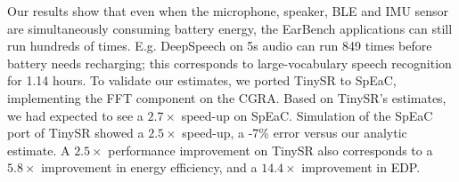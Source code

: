 Our results show that even when the microphone, speaker, BLE and IMU sensor are
simultaneously consuming battery energy, the EarBench applications can still
run hundreds of times. E.g. DeepSpeech on 5s audio can run 849 times before
battery needs recharging; this corresponds to large-vocabulary speech
recognition for 1.14 hours. To validate our estimates, we ported TinySR to
SpEaC, implementing the FFT component on the CGRA. Based on TinySR’s estimates,
we had expected to see a \(2.7\times\) speed-up on SpEaC. Simulation of the SpEaC port
of TinySR showed a \(2.5\times\) speed-up, a -7\% error versus our analytic estimate. A
\(2.5\times\) performance improvement on TinySR also corresponds to a
\(5.8\times\) improvement in energy efficiency, and a \(14.4\times\)
improvement in EDP.


